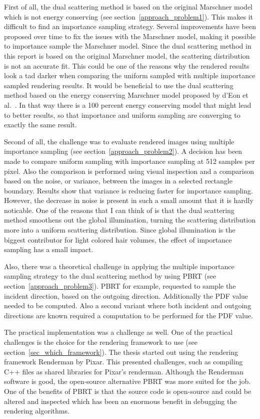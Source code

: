 \documentclass[11pt,a4paper]{report}
\begin{document}
First of all, the dual scattering method is based on the original Marschner model which is not energy conserving (see section~\ref{approach_problem1}). This makes it difficult to find an importance sampling strategy. Several improvements have been proposed over time to fix the issues with the Marschner model, making it possible to importance sample the Marschner model. Since the dual scattering method in this report is based on the original Marschner model, the scattering distribution is not an accurate fit. This could be one of the reasons why the rendered results look a tad darker when comparing the uniform sampled with multiple importance sampled rendering results.
It would be beneficial to use the dual scattering method based on the energy conserving Marschner model proposed by d'Eon et al.~\cite{eon2011}. In that way there is a 100 percent energy conserving model that might lead to better results, so that importance and uniform sampling are converging to exactly the same result.

Second of all, the challenge was to evaluate rendered images using multiple importance sampling (see section~\ref{approach_problem2}). A decision has been made to compare uniform sampling with importance sampling at 512 samples per pixel. Also the comparison is performed using visual inspection and a comparison based on the noise, or variance, between the images in a selected rectangle boundary. Results show that variance is reducing faster for importance sampling. However, the decrease in noise is present in such a small amount that it is hardly noticable. One of the reasons that I can think of is that the dual scattering method smoothens out the global illumination, turning the scattering distribution more into a uniform scattering distribution. Since global illumination is the biggest contributor for light colored hair volumes, the effect of importance sampling has a small impact.

Also, there was a theoretical challenge in applying the multiple importance sampling strategy to the dual scattering method by using PBRT (see section~\ref{approach_problem3}). PBRT for example, requested to sample the incident direction, based on the outgoing direction. Additionally the PDF value needed to be computed. Also a second variant where both incident and outgoing directions are known required a computation to be performed for the PDF value.

The practical implementation was a challenge as well. One of the practical challenges is the choice for the rendering framework to use (see section~\ref{sec_which_framework}). The thesis started out using the rendering framework Renderman by Pixar. This presented challenges, such as compiling C++ files as shared libraries for Pixar's renderman. Although the Renderman software is good, the open-source alternative PBRT was more suited for the job. One of the benefits of PBRT is that the source code is open-source and could be altered and inspected which has been an enormous benefit in debugging the rendering algorithms.
\end{document}
